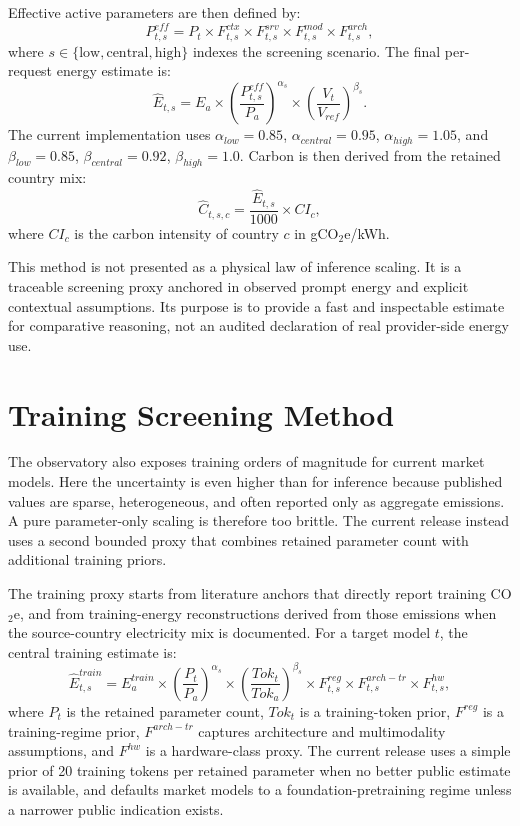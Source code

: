 \documentclass[10pt,a4paper]{article}
\begin{document}
Effective active parameters are then defined by:
\begin{equation}
P^{eff}_{t,s} = P_t \times F^{ctx}_{t,s} \times F^{srv}_{t,s} \times F^{mod}_{t,s} \times F^{arch}_{t,s},
\end{equation}
where $s \in \{\mathrm{low}, \mathrm{central}, \mathrm{high}\}$ indexes the screening scenario. The final per-request energy estimate is:
\begin{equation}
\hat{E}_{t,s} = E_a \times \left(\frac{P^{eff}_{t,s}}{P_a}\right)^{\alpha_s}
\times \left(\frac{V_t}{V_{ref}}\right)^{\beta_s}.
\end{equation}
The current implementation uses $\alpha_{low}=0.85$, $\alpha_{central}=0.95$, $\alpha_{high}=1.05$, and $\beta_{low}=0.85$, $\beta_{central}=0.92$, $\beta_{high}=1.0$. Carbon is then derived from the retained country mix:
\begin{equation}
\hat{C}_{t,s,c} = \frac{\hat{E}_{t,s}}{1000} \times CI_c,
\end{equation}
where $CI_c$ is the carbon intensity of country $c$ in gCO$_2$e/kWh.

This method is not presented as a physical law of inference scaling. It is a traceable screening proxy anchored in observed prompt energy and explicit contextual assumptions. Its purpose is to provide a fast and inspectable estimate for comparative reasoning, not an audited declaration of real provider-side energy use.

\section{Training Screening Method}
The observatory also exposes training orders of magnitude for current market models. Here the uncertainty is even higher than for inference because published values are sparse, heterogeneous, and often reported only as aggregate emissions. A pure parameter-only scaling is therefore too brittle. The current release instead uses a second bounded proxy that combines retained parameter count with additional training priors.

The training proxy starts from literature anchors that directly report training CO$_2$e, and from training-energy reconstructions derived from those emissions when the source-country electricity mix is documented. For a target model $t$, the central training estimate is:
\begin{equation}
\hat{E}^{train}_{t,s} = E^{train}_a \times \left(\frac{P_t}{P_a}\right)^{\alpha_s}
\times \left(\frac{Tok_t}{Tok_a}\right)^{\beta_s}
\times F^{reg}_{t,s} \times F^{arch-tr}_{t,s} \times F^{hw}_{t,s},
\end{equation}
where $P_t$ is the retained parameter count, $Tok_t$ is a training-token prior, $F^{reg}$ is a training-regime prior, $F^{arch-tr}$ captures architecture and multimodality assumptions, and $F^{hw}$ is a hardware-class proxy. The current release uses a simple prior of 20 training tokens per retained parameter when no better public estimate is available, and defaults market models to a foundation-pretraining regime unless a narrower public indication exists.
\end{document}
